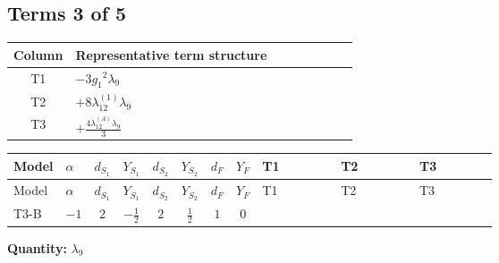 \documentclass[8pt]{article}
\begin{document}
\begin{landscape}
\subsection*{Terms 3 of 5}
\begin{center}
\begin{tabular}{@{}c >{\raggedright\arraybackslash}p{0.82\linewidth}@{}}
\toprule
Column & Representative term structure \\
\midrule
T1 & \(\displaystyle -3 {g_1}^2 {\lambda_{9}}\) \\
\midrule
T2 & \(\displaystyle +8 {\lambda_{12}^{(1)}} {\lambda_{9}}\) \\
\midrule
T3 & \(\displaystyle +\frac{4 {\lambda_{12}^{(A)}} {\lambda_{9}}}{3}\) \\
\midrule
\bottomrule
\end{tabular}
\end{center}
\smallskip
\tiny
\begin{longtable}{@{}llcccccc >{\raggedright\arraybackslash}p{0.21\linewidth} >{\raggedright\arraybackslash}p{0.21\linewidth} >{\raggedright\arraybackslash}p{0.21\linewidth}@{}}
\toprule
Model & $\alpha$ & $d_{S_1}$ & $Y_{S_1}$ & $d_{S_2}$ & $Y_{S_2}$ & $d_F$ & $Y_F$ & T1 & T2 & T3 \\
\midrule
\endfirsthead
\toprule
Model & $\alpha$ & $d_{S_1}$ & $Y_{S_1}$ & $d_{S_2}$ & $Y_{S_2}$ & $d_F$ & $Y_F$ & T1 & T2 & T3 \\
\midrule
\endhead
T3-B & $-1$ & $2$ & $-\frac{1}{2}$ & $2$ & $\frac{1}{2}$ & $1$ & $0$ & \scriptsize\adjustbox{max width=\linewidth}{$\begin{gathered} -3 {g_1}^2 {\lambda_{9}}\end{gathered}$} & \scriptsize\adjustbox{max width=\linewidth}{$\begin{gathered} +8 {\lambda_{12}^{(1)}} {\lambda_{9}}\end{gathered}$} & \scriptsize\adjustbox{max width=\linewidth}{$\begin{gathered} +\frac{4 {\lambda_{12}^{(A)}} {\lambda_{9}}}{3}\end{gathered}$} \\
\midrule
\bottomrule
\end{longtable}
\clearpage
\noindent\textbf{Quantity: }$\lambda_{9}$\par\smallskip

\end{landscape}
\end{document}
